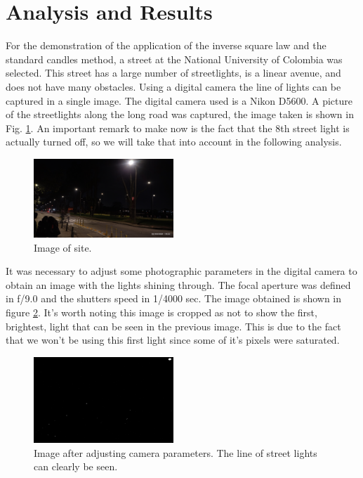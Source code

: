 \documentclass[aps,rmp,twocolumn,nofootinbib,superscriptaddress,floatfix,longbibliography]{revtex4-2}
\begin{document}
\section{Analysis and Results}
For the demonstration of the application of the inverse square law and the standard candles method, a street at the National University of Colombia was selected. This street has a large number of streetlights, is a linear avenue, and does not have many obstacles. 
Using a digital camera the line of lights can be captured in a single image. The digital camera used is a Nikon D5600. A picture of the streetlights along the long road was captured, the image taken is shown in Fig. \ref{fig:1}. An important remark to make now is the fact that the 8th street light is actually turned off, so we will take that into account in the following analysis.
\begin{figure}
    \centering
    \includegraphics[width=0.47\textwidth]{Images/DSC_1347.jpg}
    \caption{Image of site.}
    \label{fig:1}
\end{figure}

It was necessary to adjust some photographic parameters in the digital camera to obtain an image with the lights shining through. The focal aperture was defined  in f/9.0 and the shutters speed in 1/4000 sec. The image obtained is shown in figure \ref{fig:2}. It's worth noting this image is cropped as not to show the first, brightest, light that can be seen in the previous image. This is due to the fact that we won't be using this first light since some of it's pixels were saturated.

\begin{figure}
    \centering
    \includegraphics[width=0.47\textwidth]{Images/DSC_1347_.jpeg}
    \caption{Image after adjusting camera parameters. The line of street lights can clearly be seen.}
    \label{fig:2}
\end{figure}
\end{document}

